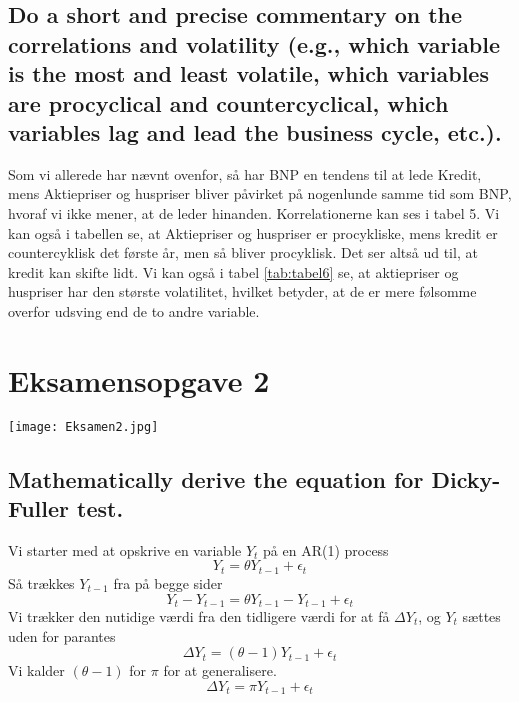 \documentclass[
  10pt,
]{article}
\begin{document}
\hypertarget{do-a-short-and-precise-commentary-on-the-correlations-and-volatility-e.g.-which-variable-is-the-most-and-least-volatile-which-variables-are-procyclical-and-countercyclical-which-variables-lag-and-lead-the-business-cycle-etc..}{%
\subsection{Do a short and precise commentary on the correlations and
volatility (e.g., which variable is the most and least volatile, which
variables are procyclical and countercyclical, which variables lag and
lead the business cycle,
etc.).}\label{do-a-short-and-precise-commentary-on-the-correlations-and-volatility-e.g.-which-variable-is-the-most-and-least-volatile-which-variables-are-procyclical-and-countercyclical-which-variables-lag-and-lead-the-business-cycle-etc..}}

Som vi allerede har nævnt ovenfor, så har BNP en tendens til at lede
Kredit, mens Aktiepriser og huspriser bliver påvirket på nogenlunde
samme tid som BNP, hvoraf vi ikke mener, at de leder hinanden.
Korrelationerne kan ses i tabel 5. Vi kan også i tabellen se, at
Aktiepriser og huspriser er procykliske, mens kredit er countercyklisk
det første år, men så bliver procyklisk. Det ser altså ud til, at kredit
kan skifte lidt. Vi kan også i tabel \ref{tab:tabel6} se, at aktiepriser
og huspriser har den største volatilitet, hvilket betyder, at de er mere
følsomme overfor udsving end de to andre variable.

\newpage

\hypertarget{eksamensopgave-2}{%
\section{Eksamensopgave 2}\label{eksamensopgave-2}}

\texttt{[image: Eksamen2.jpg]} \newpage

\hypertarget{mathematically-derive-the-equation-for-dicky-fuller-test.}{%
\subsection{Mathematically derive the equation for Dicky-Fuller
test.}\label{mathematically-derive-the-equation-for-dicky-fuller-test.}}

Vi starter med at opskrive en variable \(Y_t\) på en AR(1) process\\
\[Y_t = \theta Y_{t-1} + \epsilon_t\] Så trækkes \(Y_{t-1}\) fra på
begge sider \[ Y_{t} - Y_{t-1}=\theta Y_{t-1}-Y_{t-1}+\epsilon_{t} \] Vi
trækker den nutidige værdi fra den tidligere værdi for at få
\(\Delta Y_t\), og \(Y_t\) sættes uden for parantes
\[\Delta Y_t=(\theta-1)Y_{t-1}+\epsilon_t    \] Vi kalder \((\theta-1)\)
for \(\pi\) for at generalisere.
\[\Delta Y_t=\pi Y_{t-1} + \epsilon_t    \]
\end{document}
